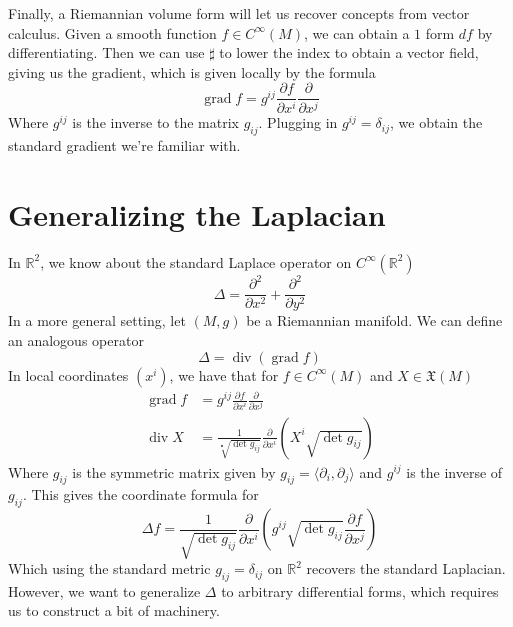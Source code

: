 \documentclass[psamsfonts]{amsart}
\theoremstyle{definition}
\theoremstyle{remark}
\newcommand{\R}{\mathbb{R}}
\DeclareMathOperator{\dv}{div}
\DeclareMathOperator{\grad}{grad}
\begin{document}
Finally, a Riemannian volume form will let us recover concepts from vector calculus. Given a smooth function $f \in C^\infty(M)$, we can obtain a $1$ form $df$ by differentiating. Then we can use $\sharp$ to lower the index to obtain a vector field, giving us the gradient, which is given locally by the formula
$$\grad f = g^{ij} \frac{\partial f}{\partial x^i} \frac{\partial}{\partial x^j} $$
Where $g^{ij}$ is the inverse to the matrix $g_{ij}$. Plugging in $g^{ij} = \delta_{ij}$, we obtain the standard gradient we're familiar with.
%
\setcounter{section}{1}
\setcounter{thm}{0}
\section*{Generalizing the Laplacian}
%
In $\R^2$, we know about the standard Laplace operator on $C^\infty(\R^2)$
$$\Delta = \frac{\partial^2}{\partial x^2} + \frac{\partial^2 }{\partial y^2}$$
In a more general setting, let $(M,g)$ be a Riemannian manifold. We can define an analogous operator
$$\Delta = \dv(\grad f) $$
In local coordinates $(x^i)$, we have that  for $f \in C^\infty(M)$  and $X \in \mathfrak{X}(M)$
\begin{align*}
\grad f &= g^{ij}\frac{\partial f}{\partial x^i}\frac{\partial }{\partial x^j} \\[6pt]
\dv X &= \frac{1}{\sqrt[•]{\det  g_{ij}}} \frac{\partial}{\partial x^i}\left(X^i \sqrt{\det g_{ij}}\right)
\end{align*}
Where $g_{ij}$ is the symmetric matrix given by $g_{ij} = \langle \partial_i ,\partial_j\rangle$ and $g^{ij}$ is the inverse of $g_{ij}$. This gives the coordinate formula for 
$$\Delta f = \frac{1}{\sqrt{\det g_{ij}}} \frac{\partial}{\partial x^i}\left( g^{ij} \sqrt{\det g_{ij}}\frac{\partial f}{\partial x^j} \right)$$
Which using the standard metric $g_{ij} = \delta_{ij}$ on $\R^2$ recovers the standard Laplacian. However, we want to generalize $\Delta$ to arbitrary differential forms, which requires us to construct a  bit of machinery.
\end{document}

